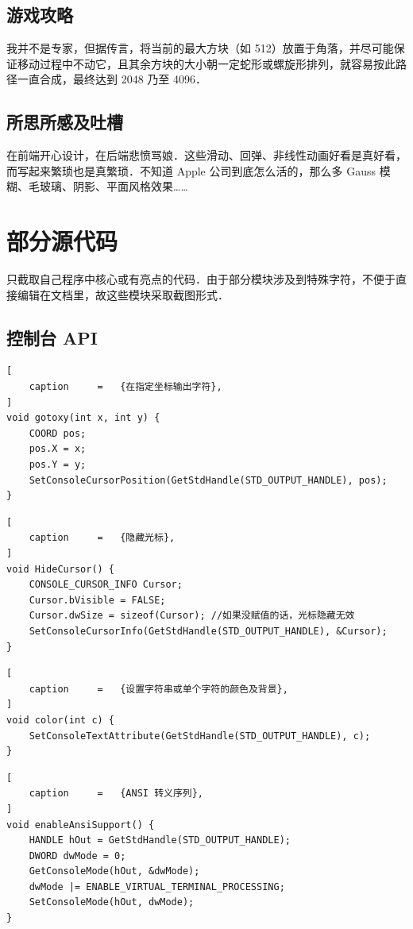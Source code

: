 \documentclass[12pt,a4paper,twoside]{ctexart}
\numberwithin{figure}{section}
\numberwithin{equation}{section}
\begin{document}
\subsection{游戏攻略}
我并不是专家，但据传言，将当前的最大方块（如 512）放置于角落，并尽可能保证移动过程中不动它，且其余方块的大小朝一定蛇形或螺旋形排列，就容易按此路径一直合成，最终达到 2048 乃至 4096．

\subsection{所思所感及吐槽}
在前端开心设计，在后端悲愤骂娘．这些滑动、回弹、非线性动画好看是真好看，而写起来繁琐也是真繁琐．不知道 Apple 公司到底怎么活的，那么多 Gauss 模糊、毛玻璃、阴影、平面风格效果……

\newpage
\section{部分源代码}
只截取自己程序中核心或有亮点的代码．由于部分模块涉及到特殊字符，不便于直接编辑在文档里，故这些模块采取截图形式．
\subsection{控制台 API}
\begin{lstlisting}[
    caption     =   {在指定坐标输出字符},
]
void gotoxy(int x, int y) {
    COORD pos;
    pos.X = x;
    pos.Y = y;
    SetConsoleCursorPosition(GetStdHandle(STD_OUTPUT_HANDLE), pos);
}
\end{lstlisting}

\begin{lstlisting}[
    caption     =   {隐藏光标},
]
void HideCursor() {
    CONSOLE_CURSOR_INFO Cursor;
    Cursor.bVisible = FALSE;
    Cursor.dwSize = sizeof(Cursor); //如果没赋值的话，光标隐藏无效
    SetConsoleCursorInfo(GetStdHandle(STD_OUTPUT_HANDLE), &Cursor);
}
\end{lstlisting}

\begin{lstlisting}[
    caption     =   {设置字符串或单个字符的颜色及背景},
]
void color(int c) {
    SetConsoleTextAttribute(GetStdHandle(STD_OUTPUT_HANDLE), c);
}
\end{lstlisting}

\begin{lstlisting}[
    caption     =   {ANSI 转义序列},
]
void enableAnsiSupport() {
    HANDLE hOut = GetStdHandle(STD_OUTPUT_HANDLE);
    DWORD dwMode = 0;
    GetConsoleMode(hOut, &dwMode);
    dwMode |= ENABLE_VIRTUAL_TERMINAL_PROCESSING;
    SetConsoleMode(hOut, dwMode);
}
\end{lstlisting}
\end{document}
